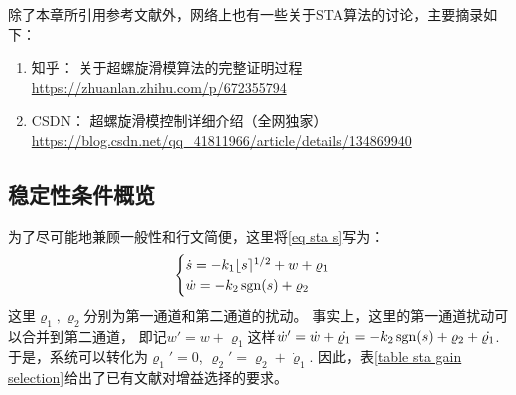 除了本章所引用参考文献外，网络上也有一些关于STA算法的讨论，主要摘录如下：
\begin{enumerate}
	\item 知乎： 关于超螺旋滑模算法的完整证明过程 \url{https://zhuanlan.zhihu.com/p/672355794}
	\item CSDN： 超螺旋滑模控制详细介绍（全网独家） \url{https://blog.csdn.net/qq_41811966/article/details/134869940}
\end{enumerate}

\subsection{稳定性条件概览}

为了尽可能地兼顾一般性和行文简便，这里将\eqref{eq sta s}写为：
\begin{equation}
	\begin{cases}
		\dot{s}=-k_1 \lfloor s \rceil^{1/2}+w+\varrho_1\\
		\dot{w}=-k_2 \mathop{\mathrm{sgn}} (s)+\varrho_2
	\end{cases}
\end{equation}
这里$\varrho_1,\varrho_2$分别为第一通道和第二通道的扰动。
事实上，这里的第一通道扰动可以合并到第二通道，
即记$w'=w+\varrho_1$这样$\dot{w}'=\dot{w}+\dot{\varrho_1}=-k_2 \mathop{\mathrm{sgn}} (s)+\varrho_2+\dot{\varrho_1}$.
于是，系统可以转化为$\varrho_1'=0$, $\varrho_2'=\varrho_2+\dot{\varrho}_1$.
因此，表\ref{table sta gain selection}给出了已有文献对增益选择的要求。


